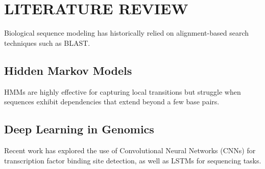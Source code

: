 \chapter{LITERATURE REVIEW}
\label{ch:background}

Biological sequence modeling has historically relied on alignment-based search techniques such as BLAST. 

\section{Hidden Markov Models}
HMMs are highly effective for capturing local transitions but struggle when sequences exhibit dependencies that extend beyond a few base pairs.

\section{Deep Learning in Genomics}
Recent work has explored the use of Convolutional Neural Networks (CNNs) for transcription factor binding site detection, as well as LSTMs for sequencing tasks.
